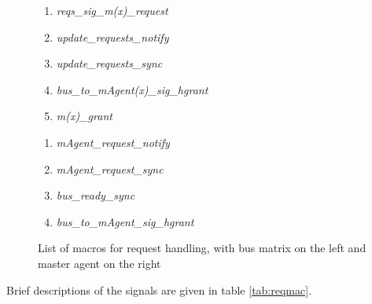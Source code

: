 \begin{figure}[hbt]
	\centering
	\begin{minipage}[t]{0.49\textwidth}
		\centering
                 \begin{enumerate}
                   \item \textit{reqs\_sig\_m(x)\_request}
                   \item \textit{update\_requests\_notify}
                   \item \textit{update\_requests\_sync}
                   \item \textit{bus\_to\_mAgent(x)\_sig\_hgrant}
                   \item \textit{m(x)\_grant}
                 \end{enumerate}
              
	\end{minipage}
	\begin{minipage}[t]{0.49\textwidth}
		\centering
		 \begin{enumerate}
                   \item \textit{mAgent\_request\_notify}
                   \item \textit{mAgent\_request\_sync}
                   \item \textit{bus\_ready\_sync}
                   \item \textit{bus\_to\_mAgent\_sig\_hgrant}
                 \end{enumerate}
              
	\end{minipage}
\caption{List of macros for request handling, with bus matrix on the left and master agent on the right}
\label{fig:reqmac}
\end{figure}

\newpage
Brief descriptions of the signals are given in table \ref{tab:reqmac}.

